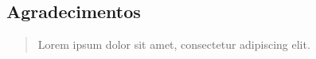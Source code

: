 \documentclass[a4paper,12pt]{article}
\begin{document}
\pagebreak
\begin{centering}
    \section*{Agradecimentos}
    \begin{quotation}
         Lorem ipsum dolor sit amet, consectetur adipiscing elit.
    \end{quotation}
\end{centering}
\pagebreak
\listoffigures
\pagebreak
\tableofcontents
\pagebreak

\pagebreak

\pagebreak

\pagebreak

\pagebreak

\pagebreak

\end{document}
